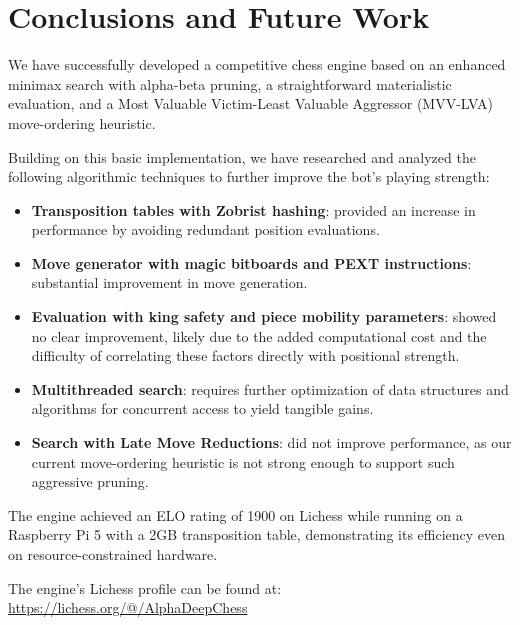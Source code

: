 \chapter{Conclusions and Future Work}
\label{cap:conclusiones}

We have successfully developed a competitive chess engine based on an enhanced minimax search with alpha-beta pruning, a straightforward materialistic evaluation, and a Most Valuable Victim-Least Valuable Aggressor (MVV-LVA) move-ordering heuristic.

\vspace{1em}

\noindent Building on this basic implementation, we have researched and analyzed the following algorithmic techniques to further improve the bot's playing strength:

\begin{itemize}
    \item \textbf{Transposition tables with Zobrist hashing}: provided an increase in performance by avoiding redundant position evaluations.
    \item \textbf{Move generator with magic bitboards and PEXT instructions}: substantial improvement in move generation.
    
    \item \textbf{Evaluation with king safety and piece mobility parameters}: showed no clear improvement, likely due to the added computational cost and the difficulty of correlating these factors directly with positional strength.
    \item \textbf{Multithreaded search}: requires further optimization of data structures and algorithms for concurrent access to yield tangible gains.
    \item \textbf{Search with Late Move Reductions}: did not improve performance, as our current move-ordering heuristic is not strong enough to support such aggressive pruning.
\end{itemize}

\noindent The engine achieved an ELO rating of 1900 on Lichess while running on a Raspberry Pi 5 with a 2GB transposition table, demonstrating its efficiency even on resource-constrained hardware.

\vspace{1em}

\noindent The engine's Lichess profile can be found at:\\
\url{https://lichess.org/@/AlphaDeepChess}

\vspace{1em}

